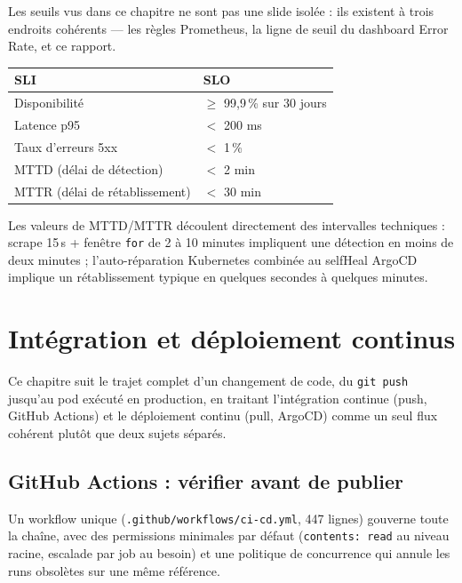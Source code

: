 \documentclass[12pt,a4paper,twoside,openright]{report}
\begin{document}
Les seuils vus dans ce chapitre ne sont pas une slide isolée : ils existent à trois
endroits cohérents — les règles Prometheus, la ligne de seuil du dashboard Error
Rate, et ce rapport.

\begin{table}[H]
\centering
\begin{tabular}{@{}ll@{}}
\toprule
\textbf{SLI} & \textbf{SLO} \\
\midrule
Disponibilité & $\geq$ 99,9\,\% sur 30 jours \\
Latence p95 & $<$ 200 ms \\
Taux d'erreurs 5xx & $<$ 1\,\% \\
MTTD (délai de détection) & $<$ 2 min \\
MTTR (délai de rétablissement) & $<$ 30 min \\
\bottomrule
\end{tabular}
\end{table}

Les valeurs de MTTD/MTTR découlent directement des intervalles techniques :
scrape 15\,s + fenêtre \texttt{for} de 2 à 10 minutes impliquent une détection en
moins de deux minutes ; l'auto-réparation Kubernetes combinée au selfHeal ArgoCD
implique un rétablissement typique en quelques secondes à quelques minutes.

\clearpage
\chapter{Intégration et déploiement continus}

Ce chapitre suit le trajet complet d'un changement de code, du \texttt{git push}
jusqu'au pod exécuté en production, en traitant l'intégration continue (push,
GitHub Actions) et le déploiement continu (pull, ArgoCD) comme un seul flux
cohérent plutôt que deux sujets séparés.

\section{GitHub Actions : vérifier avant de publier}

Un workflow unique (\texttt{.github/workflows/ci-cd.yml}, 447 lignes) gouverne toute
la chaîne, avec des permissions minimales par défaut (\texttt{contents: read} au
niveau racine, escalade par job au besoin) et une politique de concurrence qui
annule les runs obsolètes sur une même référence.
\end{document}
